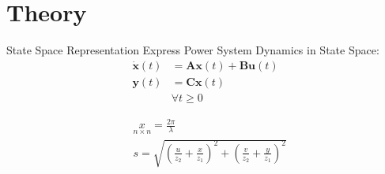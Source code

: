 \section[Theory]{Theory}
\label{sec:lasso_theory}

\begin{frame}[fragile]{State Space Representation}
	Express Power System Dynamics in State Space:
	\begin{equation}
		\label{eq:ssr}
		\begin{align}
			\dot{\textbf{x}}(t) &= 
			 \textbf{A}\textbf{x}(t)
			+ \textbf{B}\textbf{u}(t)\\
			\textbf{y}(t) &= 
			 \textbf{C}\textbf{x}(t)\\  
			& \forall t\geq0	
		\end{align}
	\end{equation}
	
	\begin{align*}
		& \underset{\scriptscriptstyle n\times n}{x}=\frac{2 \pi }{\lambda }                                                                      \\
		& s=\sqrt{\left(\frac{u}{z_2}+\frac{x}{z_1}\right)^2+\left(\frac{v}{z_2}+\frac{y}{z_1}\right)^2} 
	\end{align*}
\end{frame}